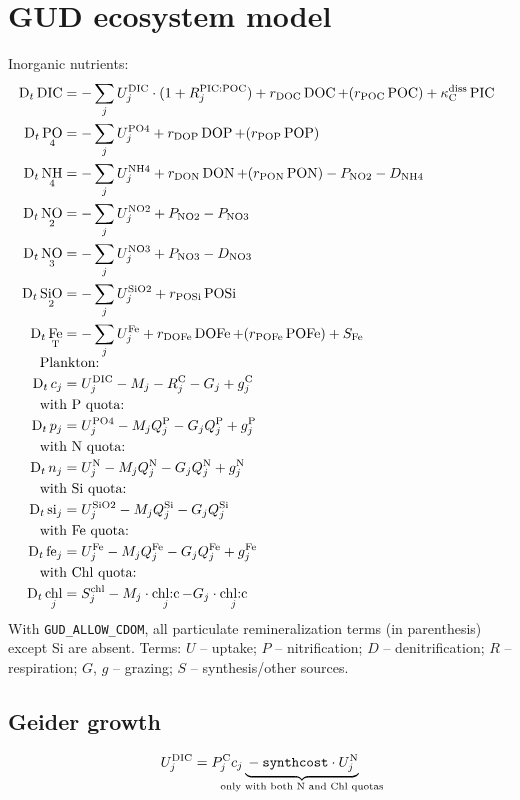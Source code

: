 \documentclass[11pt,letterpaper,english]{article}
\newcommand{\DDt}{\operatorname{D}_t}
\DeclareMathOperator{\DIC}{DIC}
\DeclareMathOperator{\PO}{PO}
\DeclareMathOperator{\Fe}{Fe}
\DeclareMathOperator{\Si}{Si}
\DeclareMathOperator{\SiO}{SiO}
\DeclareMathOperator{\NH}{NH}
\DeclareMathOperator{\NO}{NO}
\DeclareMathOperator{\DOC}{DOC}
\DeclareMathOperator{\DOP}{DOP}
\DeclareMathOperator{\DON}{DON}
\DeclareMathOperator{\DOFe}{DOFe}
\DeclareMathOperator{\POP}{POP}
\DeclareMathOperator{\PON}{PON}
\DeclareMathOperator{\POFe}{POFe}
\DeclareMathOperator{\POSi}{POSi}
\DeclareMathOperator{\PIC}{PIC}
\DeclareMathOperator{\POC}{POC}
\DeclareMathOperator{\chl}{chl}
\DeclareMathOperator{\chlc}{chl\text{:}c}
\DeclareMathOperator{\POiv}{PO4}
\DeclareMathOperator{\NHiv}{NH4}
\DeclareMathOperator{\NOii}{NO2}
\DeclareMathOperator{\NOiii}{NO3}
\DeclareMathOperator{\SiOii}{SiO2}
\newcommand{\N}{\mathrm{N}}
\newcommand{\C}{\mathrm{C}}
\renewcommand{\P}{\mathrm{P}}
\newcommand{\fe}{\mathrm{fe}}
\renewcommand{\si}{\mathrm{si}}
\newcommand{\total}{{\mathrm{T}}}
\newcommand{\FeT}{\Fe_\total}
\newcommand{\PICPOC}{{\text{PIC:POC}}}
\newcommand{\diss}{{\text{diss}}}
\newcommand{\X}{c}
\begin{document}
\section{GUD ecosystem model}

Inorganic nutrients:
\begin{align*}
  \DDt \DIC   &= -\sum_j U^{\DIC}_j \cdot (1 + R^{\PICPOC}_j)
                 + r_{\DOC} \DOC + (r_{\POC} \POC)
                 + \kappa^\diss_\C \PIC \\
  \DDt \PO_4  &= -\sum_j U^{\POiv}_j + r_{\DOP} \DOP + (r_{\POP} \POP) \\
  \DDt \NH_4  &= -\sum_j U^{\NHiv}_j + r_{\DON} \DON + (r_{\PON} \PON) - P_{\NOii}
                                     - D_{\NHiv} \\
  \DDt \NO_2  &= -\sum_j U^{\NOii}_j + P_{\NOii} - P_{\NOiii} \\
  \DDt \NO_3  &= -\sum_j U^{\NOiii}_j + P_{\NOiii} - D_{\NOiii} \\
  \DDt \SiO_2 &= -\sum_j U^{\SiOii}_j + r_{\POSi} \POSi \\
  \DDt \FeT   &= -\sum_j U^{\Fe}_j + r_{\DOFe} \DOFe + (r_{\POFe} \POFe) + S_{\Fe} \\[-1ex]
\noalign{Plankton:}
  \DDt \X_j   &= U^{\DIC}_j - M_j - R^\C_j - G_j + g_j^\C \\
\noalign{with P quota:}
  \DDt p_j    &= U^{\POiv}_j - M_j Q^\P_j - G_j Q^\P_j + g_j^\P \\
\noalign{with N quota:}
  \DDt n_j    &= U^{\N}_j - M_j Q^\N_j - G_j Q^\N_j + g_j^\N \\
\noalign{with Si quota:}
  \DDt \si_j  &= U^{\SiOii}_j - M_j Q^{\Si}_j - G_j Q^{\Si}_j \\
\noalign{with Fe quota:}
  \DDt \fe_j  &= U^{\Fe}_j - M_j Q^{\Fe}_j - G_j Q^{\Fe}_j + g_j^{\Fe} \\
\noalign{with Chl quota:}
  \DDt \chl_j &= S^{\chl}_j - M_j \cdot \chlc_j - G_j \cdot \chlc_j
\end{align*}
With \verb|GUD_ALLOW_CDOM|, all particulate remineralization terms (in parenthesis)
except Si are absent.  Terms: $U$ -- uptake; $P$ -- nitrification;
$D$ -- denitrification; $R$ -- respiration; $G$, $g$ -- grazing;
$S$ -- synthesis/other sources.



\subsection{Geider growth}

\[
  U^{\DIC}_j = P^\C_j \X_j
      \underbrace{{}-{\tt synthcost}\cdot U^\N_j}_{\mathclap{
                      \text{only with both N and Chl quotas}}}
\]
\end{document}
